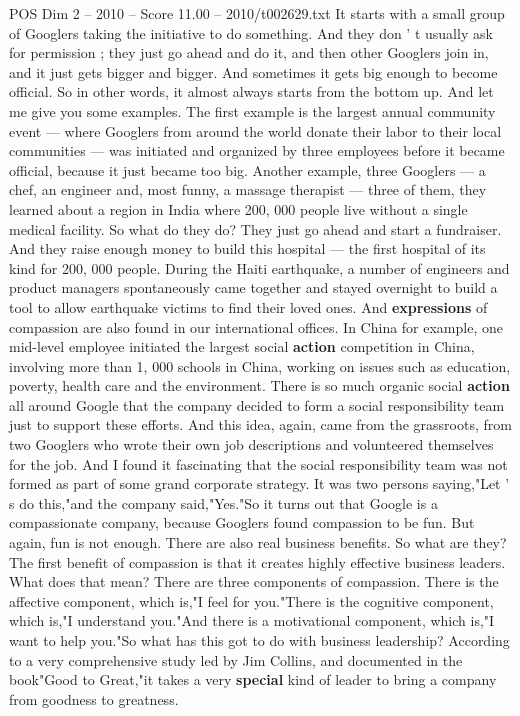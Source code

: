 \begin{textsample}{POS Dim 2 – 2010 – Score 11.00 – 2010/t002629.txt}
It starts with a small group of Googlers taking the initiative to do something.
And they don ' t usually ask for permission ; they just go ahead and do it, and then other Googlers join in, and it just gets bigger and bigger.
And sometimes it gets big enough to become official.
So in other words, it almost always starts from the bottom up.
And let me give you some examples.
The first example is the largest annual community event — where Googlers from around the world donate their labor to their local communities — was initiated and organized by three employees before it became official, because it just became too big.
Another example, three Googlers — a chef, an engineer and, most funny, a massage therapist — three of them, they learned about a region in India where 200, 000 people live without a single medical facility.
So what do they do?
They just go ahead and start a fundraiser.
And they raise enough money to build this hospital — the first hospital of its kind for 200, 000 people.
During the Haiti earthquake, a number of engineers and product managers spontaneously came together and stayed overnight to build a tool to allow earthquake victims to find their loved ones.
And \textbf{expressions} of compassion are also found in our international offices.
In China for example, one mid-level employee initiated the largest social \textbf{action} competition in China, involving more than 1, 000 schools in China, working on issues such as education, poverty, health care and the environment.
There is so much organic social \textbf{action} all around Google that the company decided to form a social responsibility team just to support these efforts.
And this idea, again, came from the grassroots, from two Googlers who wrote their own job descriptions and volunteered themselves for the job.
And I found it fascinating that the social responsibility team was not formed as part of some grand corporate strategy.
It was two persons saying,"Let ' s do this,"and the company said,"Yes."So it turns out that Google is a compassionate company, because Googlers found compassion to be fun.
But again, fun is not enough.
There are also real business benefits.
So what are they?
The first benefit of compassion is that it creates highly effective business leaders.
What does that mean?
There are three components of compassion.
There is the affective component, which is,"I feel for you."There is the cognitive component, which is,"I understand you."And there is a motivational component, which is,"I want to help you."So what has this got to do with business leadership?
According to a very comprehensive study led by Jim Collins, and documented in the book"Good to Great,"it takes a very \textbf{special} kind of leader to bring a company from goodness to greatness.

\end{textsample}

